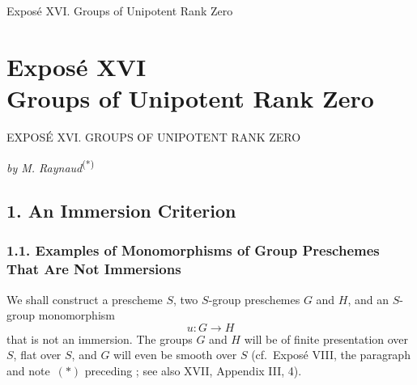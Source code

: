 
  {Exposé XVI. Groups of Unipotent Rank Zero}

\setcounter{footnote}{0}
\chapter*{Exposé XVI\\
Groups of Unipotent Rank Zero}
  {EXPOSÉ XVI. GROUPS OF UNIPOTENT RANK ZERO}

\begin{center}
  \textit{by M. Raynaud}\textsuperscript{(*)}
\end{center}
\begingroup
\renewcommand{\thefootnote}{0}
\renewcommand{\thefootnote}{*}
\endgroup

\section*{1. An Immersion Criterion}

%
\subsection*{1.1. Examples of Monomorphisms of Group Preschemes
That Are Not Immersions}

We shall construct a prescheme \(S\), two \(S\)-group preschemes
\(G\) and \(H\), and an \(S\)-group monomorphism
\[
  u:G\longrightarrow H
\]
that is not an immersion. The groups \(G\) and \(H\) will be of finite
presentation over \(S\), flat over \(S\), and \(G\) will even be
smooth over \(S\) (cf.\ Exposé VIII, the paragraph and note~\((*)\)
preceding ; see also XVII, Appendix III, 4).

